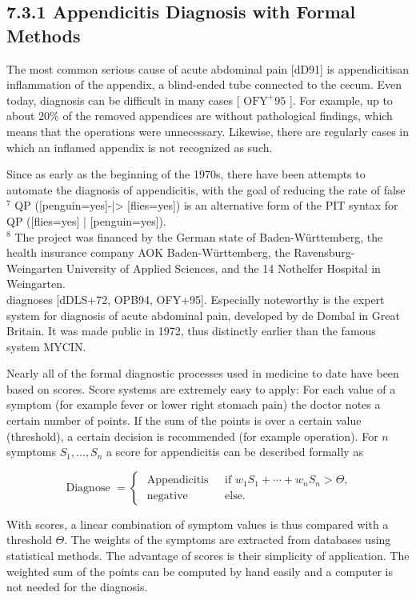 \documentclass[10pt]{book}
\begin{document}
\begin{center}
\begin{enumerate}
\subsection*{7.3.1 Appendicitis Diagnosis with Formal Methods}
The most common serious cause of acute abdominal pain [dD91] is appendicitisan inflammation of the appendix, a blind-ended tube connected to the cecum. Even today, diagnosis can be difficult in many cases [ $\mathrm{OFY}^{+} 95$ ]. For example, up to about $20 \%$ of the removed appendices are without pathological findings, which means that the operations were unnecessary. Likewise, there are regularly cases in which an inflamed appendix is not recognized as such.

Since as early as the beginning of the 1970s, there have been attempts to automate the diagnosis of appendicitis, with the goal of reducing the rate of false\\
${ }^{7}$ QP ([penguin=yes]-|> [flies=yes]) is an alternative form of the PIT syntax for QP ([flies=yes] | [penguin=yes]).\\
${ }^{8}$ The project was financed by the German state of Baden-Württemberg, the health insurance company AOK Baden-Württemberg, the Ravensburg-Weingarten University of Applied Sciences, and the 14 Nothelfer Hospital in Weingarten.\\[0pt]
diagnoses [dDLS+72, OPB94, OFY+95]. Especially noteworthy is the expert system for diagnosis of acute abdominal pain, developed by de Dombal in Great Britain. It was made public in 1972, thus distinctly earlier than the famous system MYCIN.


Nearly all of the formal diagnostic processes used in medicine to date have been based on scores. Score systems are extremely easy to apply: For each value of a symptom (for example fever or lower right stomach pain) the doctor notes a certain number of points. If the sum of the points is over a certain value (threshold), a certain decision is recommended (for example operation). For $n$ symptoms $S_{1}, \ldots, S_{n}$ a score for appendicitis can be described formally as

$$
\text { Diagnose }= \begin{cases}\text { Appendicitis } & \text { if } w_{1} S_{1}+\cdots+w_{n} S_{n}>\Theta, \\ \text { negative } & \text { else. }\end{cases}
$$

With scores, a linear combination of symptom values is thus compared with a threshold $\Theta$. The weights of the symptoms are extracted from databases using statistical methods. The advantage of scores is their simplicity of application. The weighted sum of the points can be computed by hand easily and a computer is not needed for the diagnosis.


\end{enumerate}
\end{center}
\end{document}
